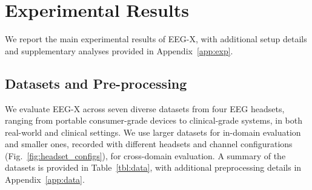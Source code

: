 \documentclass{article} %
\begin{document}
\vspace{-0.3cm}
\section{Experimental Results}
\vspace{-0.3cm}
We report the main experimental results of EEG-X, with additional setup details and supplementary analyses provided in Appendix~\ref{app:exp}.
\vspace{-0.3cm}
\subsection{Datasets and Pre-processing}
We evaluate EEG-X across seven diverse datasets from four EEG headsets, ranging from portable consumer-grade devices to clinical-grade systems, in both real-world and clinical settings. We use larger datasets for in-domain evaluation and smaller ones, recorded with different headsets and channel configurations (Fig.~\ref{fig:headset_configs}), for cross-domain evaluation. A summary of the datasets is provided in Table~\ref{tbl:data}, with additional preprocessing details in Appendix~\ref{app:data}.
\end{document}
